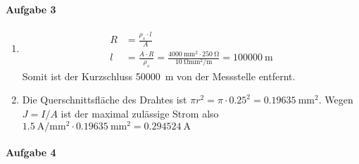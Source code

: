 \documentclass{article}
\begin{document}
\paragraph{Aufgabe 3}

\begin{enumerate}
    \item \begin{align*}
        R &= \frac{\rho_s \cdot l}{A} \\
        l &= \frac{A \cdot R}{\rho_s} = \frac{\qty{4000}{\mm\squared} \cdot \qty{250}{\ohm}}{\qty{10}{\ohm\mm\squared\per\metre}} = \qty{100000}{\metre}
    \end{align*}
    Somit ist der Kurzschluss \qty{50000}{\metre} von der Messstelle entfernt.

    \item Die Querschnittsfläche des Drahtes ist $\pi r^2 = \pi \cdot 0.25^2 = \qty{0.19635}{\mm\squared}$. Wegen $J = I/A$ ist der maximal zulässige Strom also $\qty{1.5}{\ampere\per\mm\squared} \cdot \qty{0.19635}{\mm\squared} = \qty{0.294524}{\ampere}$
\end{enumerate}

\paragraph{Aufgabe 4}
\end{document}
